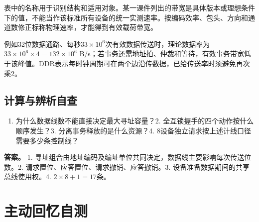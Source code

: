 表中的名称用于识别结构和适用对象。某一课件列出的带宽是具体版本或理想条件下的值，不能当作该标准所有设备的统一实测速率。按编码效率、包头、方向和通道数修正标称物理速率，才能得到有效载荷带宽。

例如32位数据通路、每秒\(33\times10^6\)次有效数据传送时，理论数据率为\(33\times10^6\times4=132\times10^6\) B/s；若事务还需地址拍、仲裁和等待，有效事务带宽低于该峰值。DDR表示每时钟周期可在两个边沿传数据，已给传送率时须避免再次乘2。

\subsection{计算与辨析自查}\label{CO06-extra-check}

\begin{enumerate}
\def\labelenumi{\arabic{enumi}.}
\tightlist
\item
  为什么数据线数不能直接决定最大寻址容量？2. 全互锁握手的四个动作按什么顺序发生？3. 分离事务释放的是什么资源？4. 8设备独立请求按上述计线口径需要多少条控制线？
\end{enumerate}

\textbf{答案。} 1. 寻址组合由地址编码及编址单位共同决定，数据线主要影响每次传送位数。2. 请求置位、应答置位、请求撤销、应答撤销。3. 设备准备数据期间的共享总线使用权。4. \(2\times8+1=17\)条。

\section{主动回忆自测}\label{CO06-recall}

